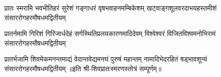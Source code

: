 
\fourlineindentedshloka
{प्रातः स्मरामि भवभीतिहरं सुरेशं}
{गङ्गाधरं वृषभवाहनमम्बिकेशम्}
{खट्वाङ्गशूलवरदाभयहस्तमीशं}
{संसाररोगहरमौषधमद्वितीयम्}

\fourlineindentedshloka
{प्रातर्नमामि गिरिशं गिरिजार्धदेहं}
{सर्गस्थितिप्रलयकारणमादिदेवम्}
{विश्वेश्वरं विजितविश्वमनोभिरामं}
{संसाररोगहरमौषधमद्वितीयम्}

\fourlineindentedshloka
{प्रातर्भजामि शिवमेकमनन्तमाद्यं}
{वेदान्तवेद्यमनघं पुरुषं महान्तम्}
{नामादिभेदरहितं षड्भावशून्यं}
{संसाररोगहरमौषधमद्वितीयम्}
॥इति श्री-शिवप्रातःस्मरणस्तोत्रं सम्पूर्णम्॥
